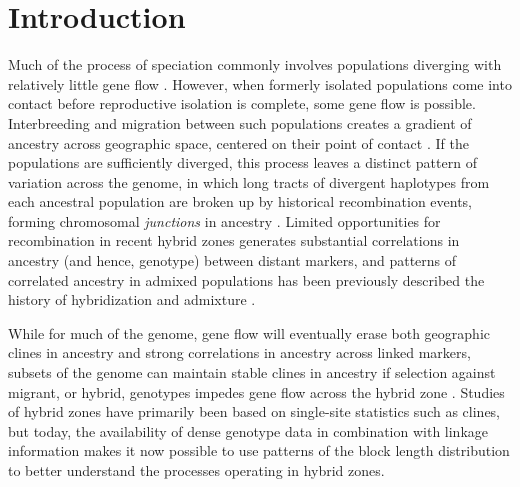\documentclass[11pt,letterpaper]{article}
\begin{document}
\linenumbers
\doublespacing


\section*{Introduction}


Much of the process of speciation commonly involves populations diverging with relatively little gene flow \citep{Coyne2004}.  
However, when formerly isolated populations come into contact before reproductive isolation is complete, some gene flow is possible.
Interbreeding and migration between such populations  
creates a gradient of ancestry across geographic space, %
centered on their point of contact \citep[reviewed in][]{Barton1985}. 
If the populations are sufficiently diverged, 
this process leaves a distinct pattern of variation across the genome, 
in which long tracts of divergent haplotypes from each ancestral population  
are broken up by historical recombination events,
forming chromosomal \emph{junctions} in ancestry \citep{Fisher1954, Chapman2002, baird2003distribution}. 
Limited opportunities for recombination in recent hybrid zones generates substantial correlations in ancestry (and hence, genotype) between distant markers, and
patterns of correlated ancestry in admixed populations has been previously described the history of hybridization and admixture \citep[e.g.][]{Gravel2012,Hellenthal2014,sedghifar2015spatial}.  


While for much of the genome, gene flow will eventually erase 
both geographic clines in ancestry and strong correlations in ancestry across linked markers, 
subsets of the genome can maintain stable clines in ancestry if selection against migrant, or hybrid, genotypes impedes gene flow across the hybrid zone \citep{Barton1979a}. 
Studies of hybrid zones have primarily been based on single-site statistics such as clines,
but today, 
the availability of dense genotype data in combination with linkage information 
makes it now possible to use patterns of the block length distribution
to better understand the processes operating in hybrid zones.
\end{document}
